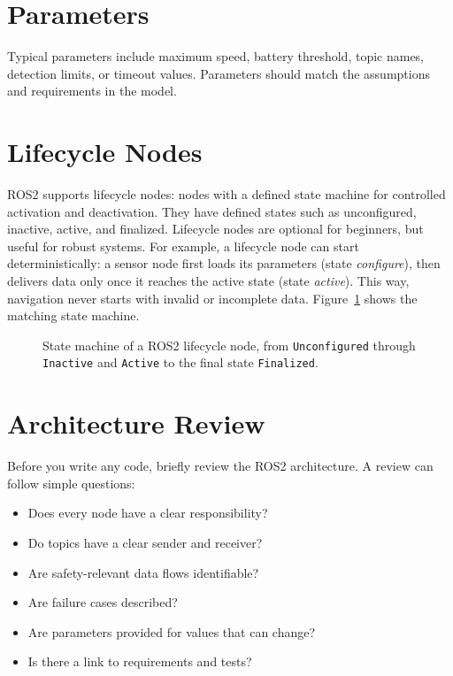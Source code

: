 \section{Parameters}
Typical parameters include maximum speed, battery threshold, topic names, detection limits, or timeout values. Parameters should match the assumptions and requirements in the model.

\section{Lifecycle Nodes}
ROS2 supports lifecycle nodes: nodes with a defined state machine for controlled activation and deactivation. They have defined states such as unconfigured, inactive, active, and finalized. Lifecycle nodes are optional for beginners, but useful for robust systems. For example, a lifecycle node can start deterministically: a sensor node first loads its parameters (state \emph{configure}), then delivers data only once it reaches the active state (state \emph{active}). This way, navigation never starts with invalid or incomplete data. Figure~\ref{fig:kap15-lifecycle} shows the matching state machine.

\begin{figure}[H]
  \centering
  \caption{State machine of a ROS2 lifecycle node, from \texttt{Unconfigured} through \texttt{Inactive} and \texttt{Active} to the final state \texttt{Finalized}.}
  \label{fig:kap15-lifecycle}
\end{figure}

\section{Architecture Review}
Before you write any code, briefly review the ROS2 architecture. A review can follow simple questions:

\begin{itemize}
    \item Does every node have a clear responsibility?
    \item Do topics have a clear sender and receiver?
    \item Are safety-relevant data flows identifiable?
    \item Are failure cases described?
    \item Are parameters provided for values that can change?
    \item Is there a link to requirements and tests?
\end{itemize}

